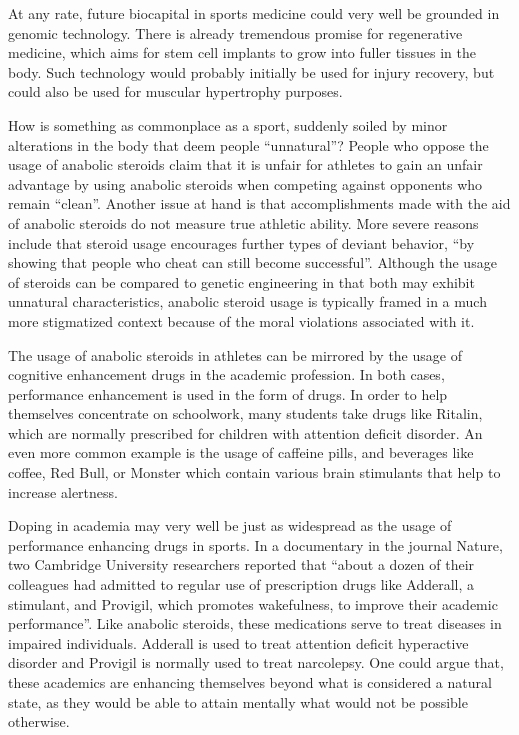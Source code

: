 At any rate, future biocapital in sports medicine could very well be grounded in genomic technology.  There is already tremendous promise for regenerative medicine, which aims for stem cell implants to grow into fuller tissues in the body. Such technology would probably initially be used for injury recovery, but could also be used for muscular hypertrophy purposes. 
	
How is something as commonplace as a sport, suddenly soiled by minor alterations in the body that deem people “unnatural”? People who oppose the usage of anabolic steroids claim that it is unfair for athletes to gain an unfair advantage by using anabolic steroids when competing against opponents who remain “clean”. Another issue at hand is that accomplishments made with the aid of anabolic steroids do not measure true athletic ability. More severe reasons include that steroid usage encourages further types of deviant behavior, “by showing that people who cheat can still become successful”. \cite{delaney} Although the usage of steroids can be compared to genetic engineering in that both may exhibit unnatural characteristics, anabolic steroid usage is typically framed in a much more stigmatized context because of the moral violations associated with it.
	
The usage of anabolic steroids in athletes can be mirrored by the usage of cognitive enhancement drugs in the academic profession.  In both cases, performance enhancement is used in the form of drugs. In order to help themselves concentrate on schoolwork, many students take drugs like Ritalin, which are normally prescribed for children with attention deficit disorder.  An even more common example is the usage of caffeine pills, and beverages like coffee, Red Bull, or Monster which contain various brain stimulants that help to increase alertness. 
	
Doping in academia may very well be just as widespread as the usage of performance enhancing drugs in sports.  In a documentary in the journal Nature, two Cambridge University researchers reported that “about a dozen of their colleagues had admitted to regular use of prescription drugs like Adderall, a stimulant, and Provigil, which promotes wakefulness, to improve their academic performance”. \cite{carey} Like anabolic steroids, these medications serve to treat diseases in impaired individuals. Adderall is used to treat attention deficit hyperactive disorder and Provigil is normally used to treat narcolepsy. One could argue that, these academics are enhancing themselves beyond what is considered a natural state, as they would be able to attain mentally what would not be possible otherwise.
	
